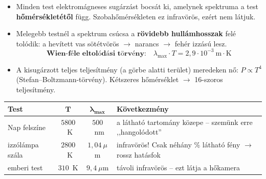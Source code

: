 \documentclass[12pt]{article}
\begin{document}
\begin{minipage}[t]{0.56\linewidth}\vspace{0pt}
\begin{itemize}
  \item Minden test elektromágneses sugárzást bocsát ki, amelynek spektruma a test
    \textbf{hőmérsékletétől} függ. Szobahőmérsékleten ez infravörös, ezért nem látjuk.
  \item Melegebb testnél a spektrum csúcsa a \textbf{rövidebb hullámhosszak} felé tolódik:
    a hevített vas sötétvörös $\to$ narancs $\to$ fehér izzású lesz.
    \[ \textbf{Wien-féle eltolódási törvény:}\quad
       \lambda_\text{max}\cdot T = 2{,}9\cdot 10^{-3}~\text{m}\cdot\text{K} \]
  \item A kisugárzott teljes teljesítmény (a görbe alatti terület) meredeken nő:
    $P \propto T^4$ (Stefan--Boltzmann-törvény). Kétszeres hőmérséklet $\to$ 16-szoros
    teljesítmény.
\end{itemize}
\end{minipage}\hfill
\begin{minipage}[t]{0.42\linewidth}\vspace{0pt}\centering
{}
\end{minipage}

\vspace{4pt}
\begin{center}
\renewcommand{\arraystretch}{1.3}
\begin{tabular}{|l|c|c|l|}
\hline
\textbf{Test} & $\boldsymbol{T}$ & $\boldsymbol{\lambda_\text{max}}$ & \textbf{Következmény} \\ \hline
Nap felszíne & $5800$~K & $500$~nm & a látható tartomány közepe -- szemünk erre ,,hangolódott'' \\
izzólámpa szála & $2800$~K & $1{,}04~\mu$m & infravörös! Csak néhány \% látható fény $\to$ rossz hatásfok \\
emberi test & $310$~K & $9{,}4~\mu$m & távoli infravörös -- ezt látja a hőkamera \\ \hline
\end{tabular}
\end{center}
\end{document}
